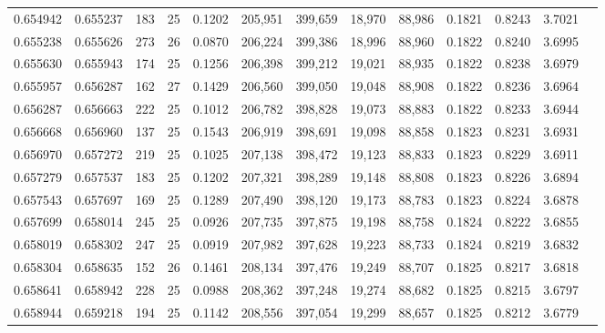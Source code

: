 \begin{tabular}{rrrrrrrrrrrrr}
0.654942 & 0.655237 &   183 &  25 &                                     0.1202 & 205,951 & 399,659 &  18,970 &  88,986 & 0.1821 & 0.8243 & 3.7021 \\
0.655238 & 0.655626 &   273 &  26 &                                     0.0870 & 206,224 & 399,386 &  18,996 &  88,960 & 0.1822 & 0.8240 & 3.6995 \\
0.655630 & 0.655943 &   174 &  25 &                                     0.1256 & 206,398 & 399,212 &  19,021 &  88,935 & 0.1822 & 0.8238 & 3.6979 \\
0.655957 & 0.656287 &   162 &  27 &                                     0.1429 & 206,560 & 399,050 &  19,048 &  88,908 & 0.1822 & 0.8236 & 3.6964 \\
0.656287 & 0.656663 &   222 &  25 &                                     0.1012 & 206,782 & 398,828 &  19,073 &  88,883 & 0.1822 & 0.8233 & 3.6944 \\
0.656668 & 0.656960 &   137 &  25 &                                     0.1543 & 206,919 & 398,691 &  19,098 &  88,858 & 0.1823 & 0.8231 & 3.6931 \\
0.656970 & 0.657272 &   219 &  25 &                                     0.1025 & 207,138 & 398,472 &  19,123 &  88,833 & 0.1823 & 0.8229 & 3.6911 \\
0.657279 & 0.657537 &   183 &  25 &                                     0.1202 & 207,321 & 398,289 &  19,148 &  88,808 & 0.1823 & 0.8226 & 3.6894 \\
0.657543 & 0.657697 &   169 &  25 &                                     0.1289 & 207,490 & 398,120 &  19,173 &  88,783 & 0.1823 & 0.8224 & 3.6878 \\
0.657699 & 0.658014 &   245 &  25 &                                     0.0926 & 207,735 & 397,875 &  19,198 &  88,758 & 0.1824 & 0.8222 & 3.6855 \\
0.658019 & 0.658302 &   247 &  25 &                                     0.0919 & 207,982 & 397,628 &  19,223 &  88,733 & 0.1824 & 0.8219 & 3.6832 \\
0.658304 & 0.658635 &   152 &  26 &                                     0.1461 & 208,134 & 397,476 &  19,249 &  88,707 & 0.1825 & 0.8217 & 3.6818 \\
0.658641 & 0.658942 &   228 &  25 &                                     0.0988 & 208,362 & 397,248 &  19,274 &  88,682 & 0.1825 & 0.8215 & 3.6797 \\
0.658944 & 0.659218 &   194 &  25 &                                     0.1142 & 208,556 & 397,054 &  19,299 &  88,657 & 0.1825 & 0.8212 & 3.6779 \\

\end{tabular}
